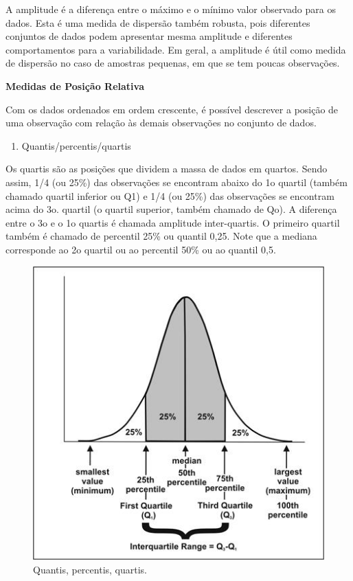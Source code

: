 \documentclass[
]{book}
\providecommand{\tightlist}{%
  \setlength{\itemsep}{0pt}\setlength{\parskip}{0pt}}
\theoremstyle{definition}
\theoremstyle{definition}
\theoremstyle{definition}
\theoremstyle{remark}
\begin{document}
A amplitude é a diferença entre o máximo e o mínimo valor observado para os dados. Esta é uma medida de dispersão também robusta, pois diferentes conjuntos de dados podem apresentar mesma amplitude e diferentes comportamentos para a variabilidade. Em geral, a amplitude é útil como medida de dispersão no caso de amostras pequenas, em que se tem poucas observações.

\textbf{Medidas de Posição Relativa}

Com os dados ordenados em ordem crescente, é possível descrever a posição de uma observação com relação às demais observações no conjunto de dados.

\begin{enumerate}
\def\labelenumi{\alph{enumi}.}
\tightlist
\item
  Quantis/percentis/quartis
\end{enumerate}

Os quartis são as posições que dividem a massa de dados em quartos. Sendo assim, 1/4 (ou 25\%) das observações se encontram abaixo do 1o quartil (também chamado quartil inferior ou Q1) e 1/4 (ou 25\%) das observações se encontram acima do 3o. quartil (o quartil superior, também chamado de Qo). A diferença entre o 3o e o 1o quartis é chamada amplitude inter-quartis. O primeiro quartil também é chamado de percentil 25\% ou quantil 0,25. Note que a mediana corresponde ao 2o quartil ou ao percentil 50\% ou ao quantil 0,5.

\begin{figure}
\includegraphics[width=0.7\linewidth]{img/medidas-posicao-relativa} \caption{Quantis, percentis, quartis.}\label{fig:ch1-medidas-posicao-relativa}
\end{figure}
\end{document}
